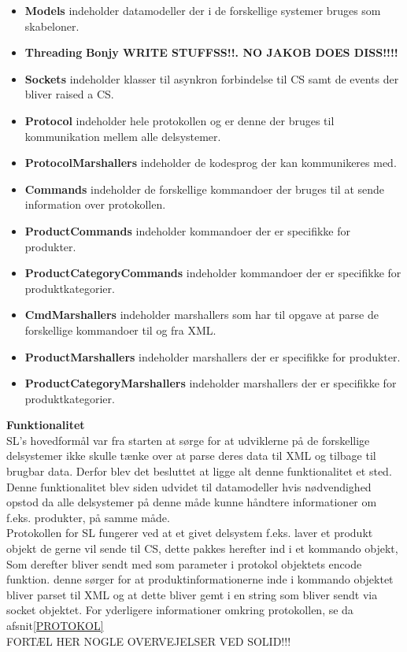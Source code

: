 \begin{itemize}
\item \textbf{Models} indeholder datamodeller der i de forskellige systemer bruges som skabeloner. 
\item \textbf{Threading} \textbf{Bonjy WRITE STUFFSS!!. NO JAKOB DOES DISS!!!!} 
\item \textbf{Sockets} indeholder klasser til asynkron forbindelse til \gls{CS} samt de events der bliver raised a \gls{CS}.
\item \textbf{Protocol} indeholder hele protokollen og er denne der bruges til kommunikation mellem alle delsystemer.
\item \textbf{ProtocolMarshallers} indeholder de kodesprog der kan kommunikeres med.
\item \textbf{Commands} indeholder de forskellige kommandoer der bruges til at sende information over protokollen.
\item \textbf{ProductCommands} indeholder kommandoer der er specifikke for produkter.
\item \textbf{ProductCategoryCommands} indeholder kommandoer der er specifikke for produktkategorier.
\item \textbf{CmdMarshallers} indeholder marshallers som har til opgave at parse de forskellige kommandoer til og fra XML.
\item \textbf{ProductMarshallers} indeholder marshallers der er specifikke for produkter.
\item \textbf{ProductCategoryMarshallers} indeholder marshallers der er specifikke for produktkategorier.
\end{itemize}

\textbf{Funktionalitet}\\

\gls{SL}'s hovedformål var fra starten at sørge for at udviklerne på de forskellige delsystemer ikke skulle tænke over at parse deres data til XML og tilbage til brugbar data. Derfor blev det besluttet at ligge alt denne funktionalitet et sted. Denne funktionalitet blev siden udvidet til datamodeller hvis nødvendighed opstod da alle delsystemer på denne måde kunne håndtere informationer om f.eks. produkter, på samme måde.\\

Protokollen for \gls{SL} fungerer ved at et givet delsystem f.eks. laver et produkt objekt de gerne vil sende til \gls{CS}, dette pakkes herefter ind i et kommando objekt, Som derefter bliver sendt med som parameter i protokol objektets encode funktion. denne sørger for at produktinformationerne inde i kommando objektet bliver parset til XML og at dette bliver gemt i en string som bliver sendt via socket objektet. For yderligere informationer omkring protokollen, se da afsnit\ref{PROTOKOL}\\

FORTÆL HER NOGLE OVERVEJELSER VED SOLID!!!\\







